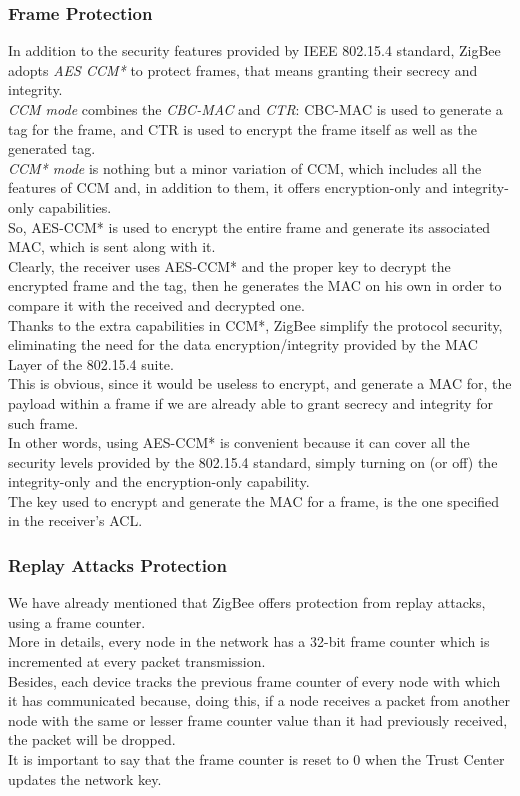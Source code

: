\documentclass[12pt]{report}
\begin{document}
{\subsubsection{Frame Protection}
\bigskip
In addition to the security features provided by IEEE 802.15.4 standard,  ZigBee adopts \emph{AES CCM*} to protect frames, that means granting their secrecy and integrity.\\
\emph{CCM mode} combines the \emph{CBC-MAC} and \emph{CTR}: CBC-MAC is used to generate a tag for the frame, and CTR is used to encrypt the frame itself as well as the generated tag.\\
\emph{CCM* mode} is nothing but a minor variation of CCM, which includes all the features of CCM and, in addition to them, it offers encryption-only and integrity-only capabilities.\\

So, AES-CCM* is used to encrypt the entire frame and generate its associated MAC, which is sent along with it.\\
Clearly, the receiver uses AES-CCM* and the proper key to decrypt the encrypted frame and the tag, then he generates the MAC on his own in order to compare it with the received and decrypted one.\\
Thanks to the extra capabilities in CCM*, ZigBee simplify the protocol security, eliminating the need for the data encryption/integrity provided by the MAC Layer of the 802.15.4 suite.\\
This is obvious, since it would be useless to encrypt, and generate a MAC for, the payload within a frame if we are already able to grant secrecy and integrity for such frame.\\
In other words, using AES-CCM* is convenient because it can cover all the security levels provided by the 802.15.4 standard, simply turning on (or off) the integrity-only and the encryption-only capability.\\
The key used to encrypt and generate the MAC for a frame, is the one specified in the receiver's ACL.


\subsubsection{Replay Attacks Protection}
\bigskip
We have already mentioned that ZigBee offers protection from replay attacks, using a frame counter.\\
More in details, every node in the network has a 32-bit frame counter which is incremented at every packet transmission.\\
Besides, each device tracks the previous frame counter of every node with which it has communicated because, doing this, if a node receives a packet from another node with the same or lesser frame counter value than it had previously received, the packet will be dropped.\\
It is important to say that the frame counter is reset to 0 when the Trust Center updates the network key.

}
\end{document}

